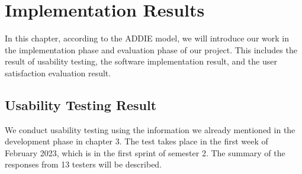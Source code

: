 \documentclass[12pt,oneside,openright,a4paper]{cpe-english-project}
\begin{document}
\chapter{Implementation Results}
In this chapter, according to the ADDIE model, we will introduce our work in the implementation phase and evaluation phase of our project. This includes the result of usability testing, the software implementation result, and the user satisfaction evaluation result.


\section{Usability Testing Result}
We conduct usability testing using the information we already mentioned in the development phase in chapter 3. The test takes place in the first week of February 2023, which is in the first sprint of semester 2. The summary of the responses from 13 testers will be described.
\end{document}
